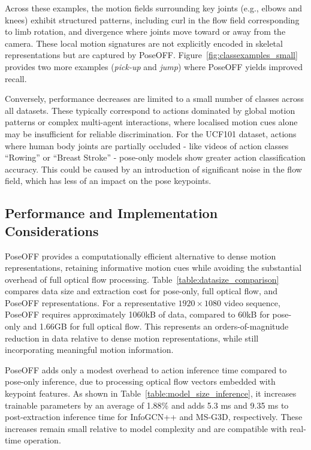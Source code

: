 \documentclass[letterpaper, 10 pt, conference]{ieeeconf}
\begin{document}
Across these examples, the motion fields surrounding key joints (e.g., elbows and knees) exhibit structured patterns, including curl in the flow field corresponding to limb rotation, and divergence where joints move toward or away from the camera. These local motion signatures are not explicitly encoded in skeletal representations but are captured by PoseOFF.  Figure~\ref{fig:classexamples_small} provides two more examples (\emph{pick-up} and \emph{jump}) where PoseOFF yields improved recall.

Conversely, performance decreases are limited to a small number of classes across all datasets. These typically correspond to actions dominated by global motion patterns or complex multi-agent interactions, where localised motion cues alone may be insufficient for reliable discrimination. For the UCF101 dataset, actions where human body joints are partially occluded - like videos of action classes ``Rowing'' or ``Breast Stroke'' - pose-only models show greater action classification accuracy. This could be caused by an introduction of significant noise in the flow field, which has less of an impact on the pose keypoints.


\subsection{Performance and Implementation Considerations}
\label{subsec:inference_time}
PoseOFF provides a computationally efficient alternative to dense motion representations, retaining informative motion cues while avoiding the substantial overhead of full optical flow processing. Table~\ref{table:datasize_comparison} compares data size and extraction cost for pose-only, full optical flow, and PoseOFF representations. For a representative $1920\times1080$ video sequence, PoseOFF requires approximately 1060kB of data, compared to 60kB for pose-only and 1.66GB for full optical flow. This represents an orders-of-magnitude reduction in data relative to dense motion representations, while still incorporating meaningful motion information.

PoseOFF adds only a modest overhead to action inference time compared to pose-only inference, due to processing optical flow vectors embedded with keypoint features. As shown in Table~\ref{table:model_size_inference}, it increases trainable parameters by an average of 1.88\% and adds 5.3 ms and 9.35 ms to post-extraction inference time for InfoGCN++ and MS-G3D, respectively. These increases remain small relative to model complexity and are compatible with real-time operation.
\end{document}
